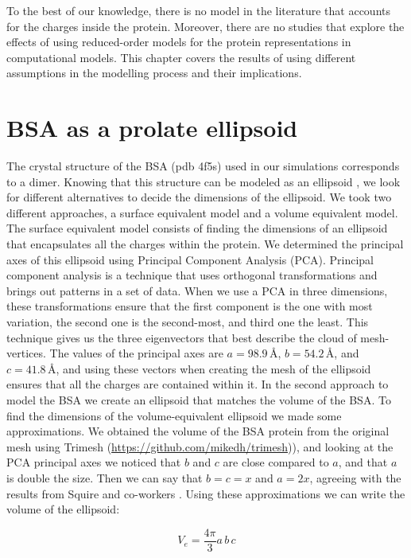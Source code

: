 To the best of our knowledge, there is no model in the literature that accounts for the charges inside the protein. 
Moreover, there are no studies that explore the effects of using reduced-order models for the protein representations 
in computational models. This chapter covers the results of using different assumptions in the modelling process and their implications.

\section{BSA as a prolate ellipsoid} \label{sec:ell_study}

The crystal structure of the BSA (pdb 4f5s) used in our simulations corresponds
to a dimer. Knowing that this structure can be modeled as an ellipsoid \cite{SquireETal1968},
we look for different alternatives to decide the dimensions of the ellipsoid. We took two
different approaches, a surface equivalent model and a volume equivalent model. The surface equivalent
model consists of finding the dimensions of an ellipsoid that encapsulates all the charges within the protein. We determined the principal axes of this
ellipsoid using Principal Component Analysis (PCA). Principal component analysis is a technique that
uses orthogonal transformations and brings out patterns in a set of data. When 
we use a PCA in three dimensions, these transformations ensure that the first 
component is the one with most variation, the second one is the second-most, and
third one the least. This technique gives us the three eigenvectors that best 
describe the cloud of mesh-vertices. The values of the principal axes are $a=98.9\, \text{\AA}$, $b=54.2\, \text{\AA}$, and $c=41.8\, \text{\AA}$, and 
using these vectors when creating the mesh of the ellipsoid ensures that all the charges are contained within it.
In the second approach to model the BSA we create an ellipsoid that matches the volume of the BSA. To find the dimensions 
of the volume-equivalent ellipsoid we made some approximations. We obtained the volume of the BSA protein from the original mesh
using Trimesh (\url{https://github.com/mikedh/trimesh})), and looking at the PCA principal axes we noticed that $b$ and $c$ are close 
compared to $a$, and that $a$ is double the size. Then we can say that $b=c=x$ and $a=2x$, agreeing with the results from Squire and co-workers
\cite{SquireETal1968}. Using these approximations we can write the volume of the ellipsoid:

\begin{equation}
    V_e = \frac{4\pi}{3}a\,b\,c 
\end{equation}

